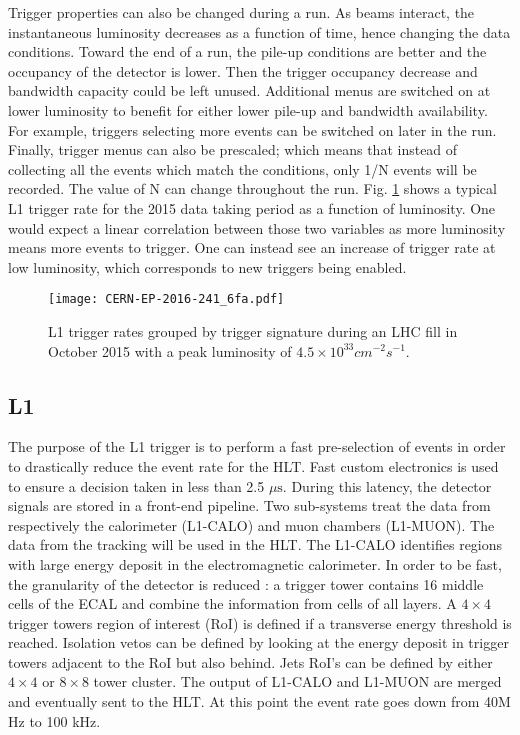 Trigger properties can also be changed during a run.
As beams interact, the instantaneous luminosity decreases as a function of time, hence changing the data conditions.
Toward the end of a run, the pile-up conditions are better and the occupancy of the detector is lower.
Then the trigger occupancy decrease and bandwidth capacity could be left unused.
Additional menus are switched on at lower luminosity to benefit for either lower pile-up and bandwidth availability.
For example, triggers selecting more events can be switched on later in the run.
Finally, trigger menus can also be prescaled; which means that instead of collecting all the events which match the conditions, only 1/N events will be recorded.
The value of N can change throughout the run.
Fig. \ref{fig:orgae8f23c} shows a typical L1 trigger rate for the 2015 data taking period as a function of luminosity.
One would expect a linear correlation between those two variables as more luminosity means more events to trigger.
One can instead see an increase of trigger rate at low luminosity, which corresponds to new triggers being enabled.

\begin{figure}[htbp]
\centering
\texttt{[image: CERN-EP-2016-241\_6fa.pdf]}
\caption{\label{fig:orgae8f23c}
L1 trigger rates grouped by trigger signature during an LHC fill in October 2015 with a peak luminosity of \(4.5\times10^{33} cm^{-2}s^{-1}\). \cite{CERN-EP-2016-241}}
\end{figure}


\subsection{L1}
\label{sec:org0661072}

The purpose of the L1 trigger is to perform a fast pre-selection of events in order to drastically reduce the event rate for the HLT.
Fast custom electronics is used to ensure a decision taken in less than 2.5 \(\mu\text{s}\).
During this latency, the detector signals are stored in a front-end pipeline.
Two sub-systems treat the data from respectively the calorimeter (L1-CALO) and muon chambers (L1-MUON).
The data from the tracking will be used in the HLT.
The L1-CALO \cite{ATL-COM-DAQ-2008-002} identifies regions with large energy deposit in the electromagnetic calorimeter.
In order to be fast, the granularity of the detector is reduced : a trigger tower contains 16 middle cells of the ECAL and combine the information from cells of all layers.
A \(4\times 4\) trigger towers region of interest (RoI) is defined if a transverse energy threshold is reached.
Isolation vetos can be defined by looking at the energy deposit in trigger towers adjacent to the RoI but also behind.
Jets RoI's can be defined by either \(4\times 4\) or \(8\times 8\) tower cluster.
The output of L1-CALO and L1-MUON are merged and eventually sent to the HLT.
At this point the event rate goes down from 40M Hz to 100 kHz.


